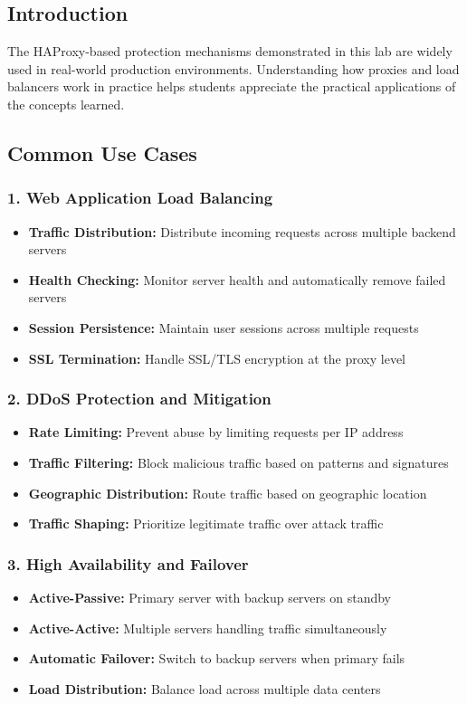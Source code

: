 \documentclass[12pt]{article}
\begin{document}
\subsection{Introduction}
The HAProxy-based protection mechanisms demonstrated in this lab are widely used in real-world production environments. Understanding how proxies and load balancers work in practice helps students appreciate the practical applications of the concepts learned.

\subsection{Common Use Cases}

\subsubsection{1. Web Application Load Balancing}
\begin{itemize}
    \item \textbf{Traffic Distribution:} Distribute incoming requests across multiple backend servers
    \item \textbf{Health Checking:} Monitor server health and automatically remove failed servers
    \item \textbf{Session Persistence:} Maintain user sessions across multiple requests
    \item \textbf{SSL Termination:} Handle SSL/TLS encryption at the proxy level
\end{itemize}

\subsubsection{2. DDoS Protection and Mitigation}
\begin{itemize}
    \item \textbf{Rate Limiting:} Prevent abuse by limiting requests per IP address
    \item \textbf{Traffic Filtering:} Block malicious traffic based on patterns and signatures
    \item \textbf{Geographic Distribution:} Route traffic based on geographic location
    \item \textbf{Traffic Shaping:} Prioritize legitimate traffic over attack traffic
\end{itemize}

\subsubsection{3. High Availability and Failover}
\begin{itemize}
    \item \textbf{Active-Passive:} Primary server with backup servers on standby
    \item \textbf{Active-Active:} Multiple servers handling traffic simultaneously
    \item \textbf{Automatic Failover:} Switch to backup servers when primary fails
    \item \textbf{Load Distribution:} Balance load across multiple data centers
\end{itemize}
\end{document}
